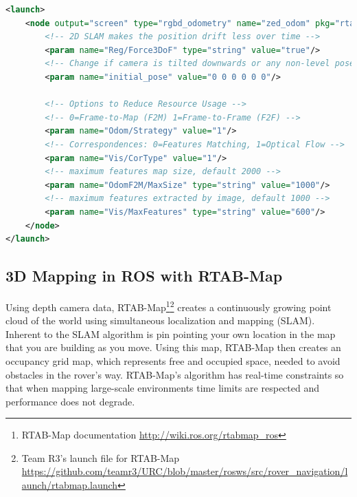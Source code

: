 \documentclass[runningheads,a4paper]{llncs}
\begin{document}
\begin{lstlisting}[language=XML,frame=single,basicstyle=\ttfamily\footnotesize,breaklines=true,captionpos=b,caption={Important settings to optimize the rgbd\_odometry ROS node.},label={lst:rgbd}]
<launch>
    <node output="screen" type="rgbd_odometry" name="zed_odom" pkg="rtabmap_ros">
        <!-- 2D SLAM makes the position drift less over time -->
        <param name="Reg/Force3DoF" type="string" value="true"/> 
        <!-- Change if camera is tilted downwards or any non-level pose -->
        <param name="initial_pose" value="0 0 0 0 0 0"/>

        <!-- Options to Reduce Resource Usage -->
        <!-- 0=Frame-to-Map (F2M) 1=Frame-to-Frame (F2F) -->
        <param name="Odom/Strategy" value="1"/>
        <!-- Correspondences: 0=Features Matching, 1=Optical Flow -->
        <param name="Vis/CorType" value="1"/>
        <!-- maximum features map size, default 2000 -->
        <param name="OdomF2M/MaxSize" type="string" value="1000"/> 
        <!-- maximum features extracted by image, default 1000 -->
        <param name="Vis/MaxFeatures" type="string" value="600"/>
    </node>
</launch>
\end{lstlisting} 

\subsection{3D Mapping in ROS with RTAB-Map}
Using depth camera data, RTAB-Map\footnote{RTAB-Map documentation \url{http://wiki.ros.org/rtabmap_ros}}\footnote{Team R3's launch file for RTAB-Map \url{https://github.com/teamr3/URC/blob/master/rosws/src/rover_navigation/launch/rtabmap.launch}} creates a continuously growing point cloud of the world using simultaneous localization and mapping (SLAM)\cite{labbe2013appearance}. Inherent to the SLAM algorithm is pin pointing your own location in the map that you are building as you move. Using this map, RTAB-Map then creates an occupancy grid map\cite{Fankhauser2016GridMapLibrary}, which represents free and occupied space, needed to avoid obstacles in the rover's way. RTAB-Map's algorithm has real-time constraints so that when mapping large-scale environments time limits are respected and performance does not degrade\cite{labbe2017long}.
 
\end{document}
